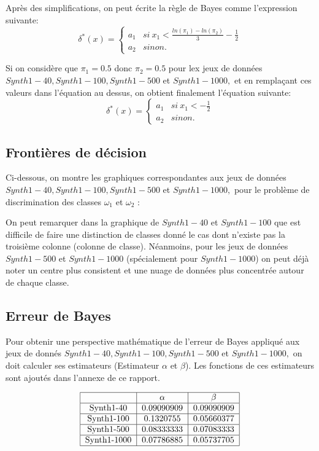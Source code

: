 \documentclass[a4paper,11pt]{article}
\begin{document}
Après des simplifications, on peut écrite la règle de Bayes comme l'expression suivante: 
\[\delta^{*}(x) = \begin{cases} 
  a_{1} & si  \> x_1 < \frac{ln(\pi_1)-ln(\pi_2)}{3} - \frac{1}{2} \\
  a_{2} & sinon.
\end{cases}\]

Si on considère que $\pi_1 = 0.5$ donc $\pi_2= 0.5$ pour lex jeux de données $Synth1-40, Synth1-100, Synth1-500$ et $Synth1-1000,$ et en remplaçant ces valeurs dans l'équation au dessus, on obtient finalement l'équation suivante:
\[\delta^{*}(x) = \begin{cases} 
  a_{1} & si  \> x_1 < - \frac{1}{2} \\
  a_{2} & sinon.
\end{cases}\]



\subsection*{Frontières de décision}

Ci-dessous, on montre les graphiques correspondantes aux jeux de données $Synth1-40, Synth1-100, Synth1-500$ et $Synth1-1000,$ pour le problème de discrimination des classes $\omega_{1}$ et $\omega_{2}$ :


On peut remarquer dans la graphique de $Synth1-40$ et $Synth1-100$ que est difficile de faire une distinction de classes donné le cas dont n'existe pas la troisième colonne (colonne de classe). Néanmoins, pour les jeux de données $Synth1-500$ et $Synth1-1000$ (spécialement pour $Synth1-1000$) on peut déjà noter un centre plus consistent et une nuage de données plus concentrée autour de chaque classe. 



\subsection*{Erreur de Bayes}

Pour obtenir une perspective mathématique de l'erreur de Bayes appliqué aux jeux de donnés $Synth1-40, Synth1-100, Synth1-500$ et $Synth1-1000,$ on doit calculer ses estimateurs (Estimateur $\alpha$ et $\beta$).
Les fonctions de ces estimateurs sont ajoutés dans l'annexe de ce rapport.


\[
\begin{tabular}{|c|c|c|}
\hline
 & $\alpha$ & $\beta$ \\
\hline
Synth1-40 & 0.09090909 & 0.09090909 \\
\hline
Synth1-100 & 0.1320755 & 0.05660377 \\
\hline
Synth1-500 & 0.08333333 & 0.07083333 \\
\hline
Synth1-1000 & 0.07786885 & 0.05737705 \\
\hline
\end{tabular}
\]
\pagebreak
\end{document}
